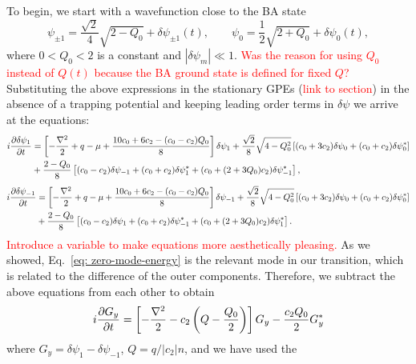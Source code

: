 To begin, we start with a wavefunction close to the BA state
\begin{equation}
    \psi_{\pm 1} = \frac{\sqrt{2}}{4}\sqrt{2 - Q_0} + \delta\psi_{\pm 1}(t),
    \qquad
    \psi_0 = \frac{1}{2}\sqrt{2 + Q_0} + \delta \psi_0(t),
\end{equation}
where $0 < Q_0 < 2$ is a constant and $|\delta\psi_m| \ll 1$.
\textcolor{red}{Was the reason for using $Q_0$ instead of $Q(t)$ because
the BA ground state is defined for fixed $Q$?}
Substituting the above expressions in the stationary GPEs
(\textcolor{red}{link to section}) in the absence of a trapping potential and
keeping leading order terms in $\delta\psi$ we
arrive at the equations:
\begin{equation}
    \begin{aligned}
        i\pdv{\delta\psi_1}{t} &= \left[-\frac{\nabla^2}{2} + q - \mu 
        + \frac{10c_0+6c_2-(c_0-c_2)Q_0}{8}\right]\delta\psi_1 
        + \frac{\sqrt{2}}{8}\sqrt{4-Q_0^2}\left[(c_0+3c_2)\delta\psi_0 
        + (c_0+c_2)\delta\psi_0^*\right] \\
        &+ \frac{2-Q_0}{8}\left[(c_0-c_2)\delta\psi_{-1}
        + (c_0+c_2)\delta\psi_1^* 
        + (c_0 + (2+3Q_0)c_2)\delta\psi_{-1}^*\right],
    \end{aligned}
\end{equation}
\begin{equation} 
    \begin{aligned}
        i\pdv{\delta\psi_{-1}}{t} &= \left[-\frac{\nabla^2}{2} + q - \mu 
        + \frac{10c_0+6c_2-(c_0-c_2)Q_0}{8}\right]\delta\psi_{-1} 
        + \frac{\sqrt{2}}{8}\sqrt{4-Q_0^2}\left[(c_0+3c_2)\delta\psi_0 
        + (c_0+c_2)\delta\psi_0^*\right] \\
        &+ \frac{2-Q_0}{8}\left[(c_0-c_2)\delta\psi_{1}
        + (c_0+c_2)\delta\psi_{-1}^* 
        + (c_0 + (2+3Q_0)c_2)\delta\psi_{1}^*\right].
    \end{aligned}
\end{equation}
\textcolor{red}{Introduce a variable to make equations more aesthetically
pleasing.}
As we showed, Eq.~\eqref{eq: zero-mode-energy} is the relevant mode in our
transition, which is related to the difference of the outer components.
Therefore, we subtract the above equations from each other to obtain
\begin{equation}
    i\pdv{G_y}{t} = \left[-\frac{\nabla^2}{2} - c_2\left(Q 
    - \frac{Q_0}{2}\right)\right]G_y - \frac{c_2Q_0}{2}G_y^*
\end{equation}
where $G_y = \delta\psi_1 - \delta\psi_{-1}$, $Q=q/|c_2|n$, and we have used the
